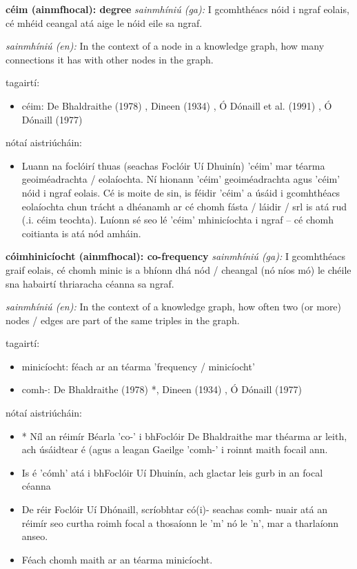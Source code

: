 \documentclass{article}
\begin{document}
\textbf{céim (ainmfhocal): degree}
\textit{sainmhíniú (ga):} I gcomhthéacs nóid i ngraf eolais, cé mhéid ceangal atá aige le nóid eile sa ngraf.

\textit{sainmhíniú (en):} In the context of a node in a knowledge graph, how many connections it has with other nodes in the graph.

tagairtí:
\begin{itemize}
	\item céim: De Bhaldraithe (1978) \cite{de-bhaldraithe}, Dineen (1934) \cite{dineen}, Ó Dónaill et al. (1991) \cite{focloir-beag}, Ó Dónaill (1977) \cite{odonaill}
\end{itemize}

nótaí aistriúcháin:
\begin{itemize}
	\item Luann na foclóirí thuas (seachas Foclóir Uí Dhuinín) 'céim' mar téarma geoiméadrachta / eolaíochta. Ní hionann 'céim' geoiméadrachta agus 'céim' nóid i ngraf eolais. Cé is moite de sin, is féidir 'céim' a úsáid i gcomhthéacs eolaíochta chun trácht a dhéanamh ar cé chomh fásta / láidir / srl is atá rud (.i. céim teochta). Luíonn sé seo lé 'céim' mhinicíochta i ngraf -- cé chomh coitianta is atá nód amháin.
\end{itemize}


\textbf{cóimhinicíocht (ainmfhocal): co-frequency}
\textit{sainmhíniú (ga):} I gcomhthéacs graif eolais, cé chomh minic is a bhíonn dhá nód / cheangal (nó níos mó) le chéile sna habairtí thriaracha céanna sa ngraf.

\textit{sainmhíniú (en):} In the context of a knowledge graph, how often two (or more) nodes / edges are part of the same triples in the graph.

tagairtí:
\begin{itemize}
	\item minicíocht: féach ar an téarma 'frequency / minicíocht'
	\item comh-: De Bhaldraithe (1978) \cite{de-bhaldraithe}*, Dineen (1934) \cite{dineen}, Ó Dónaill (1977) \cite{odonaill}
\end{itemize}

nótaí aistriúcháin:
\begin{itemize}
	\item * Níl an réimír Béarla 'co-' i bhFoclóir De Bhaldraithe mar théarma ar leith, ach úsáidtear é (agus a leagan Gaeilge 'comh-' i roinnt maith focail ann.
	\item Is é 'cómh' atá i bhFoclóir Uí Dhuinín, ach glactar leis gurb in an focal céanna
	\item De réir Foclóir Uí Dhónaill, scríobhtar có(i)- seachas comh- nuair atá an réimír seo curtha roimh focal a thosaíonn le 'm' nó le 'n', mar a tharlaíonn anseo.
	\item Féach chomh maith ar an téarma minicíocht.
\end{itemize}
\end{document}
